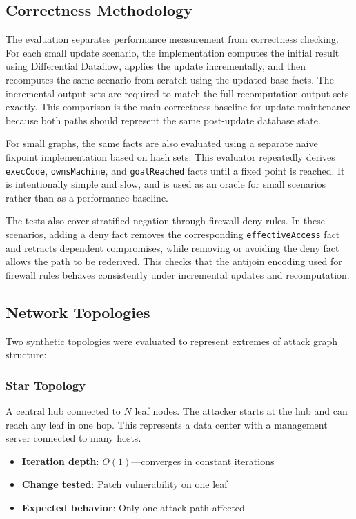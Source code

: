 \documentclass[conference]{IEEEtran}
\begin{document}
\subsection{Correctness Methodology}

The evaluation separates performance measurement from correctness checking. For
each small update scenario, the implementation computes the initial result using
Differential Dataflow, applies the update incrementally, and then recomputes the
same scenario from scratch using the updated base facts. The incremental output
sets are required to match the full recomputation output sets exactly. This
comparison is the main correctness baseline for update maintenance because both
paths should represent the same post-update database state.

For small graphs, the same facts are also evaluated using a separate naive
fixpoint implementation based on hash sets. This evaluator repeatedly derives
\texttt{execCode}, \texttt{ownsMachine}, and \texttt{goalReached} facts until a
fixed point is reached. It is intentionally simple and slow, and is used as an
oracle for small scenarios rather than as a performance baseline.

The tests also cover stratified negation through firewall deny rules. In these
scenarios, adding a deny fact removes the corresponding
\texttt{effectiveAccess} fact and retracts dependent compromises, while removing
or avoiding the deny fact allows the path to be rederived. This checks that the
antijoin encoding used for firewall rules behaves consistently under
incremental updates and recomputation.

\subsection{Network Topologies}

Two synthetic topologies were evaluated to represent extremes of attack graph structure:

\subsubsection{Star Topology}
A central hub connected to $N$ leaf nodes. The attacker starts at the hub and can reach any leaf in one hop. This represents a data center with a management server connected to many hosts.

\begin{itemize}
    \item \textbf{Iteration depth}: $O(1)$---converges in constant iterations
    \item \textbf{Change tested}: Patch vulnerability on one leaf
    \item \textbf{Expected behavior}: Only one attack path affected
\end{itemize}
\end{document}
